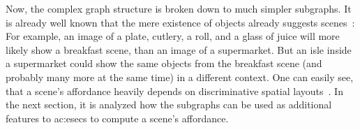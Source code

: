 Now, the complex graph structure is broken down to much simpler subgraphs.
It is already well known that the mere existence of objects already suggests scenes~\cite{zhu2014reasoning}: For example, an image of a plate, cutlery, a roll, and a glass of juice will more likely show a breakfast scene, than an image of a supermarket.
But an isle inside a supermarket could show the same objects from the breakfast scene (and probably many more at the same time) in a different context.
One can easily see, that a scene's affordance heavily depends on discriminative spatial layouts~\cite{tran2017recognition, lin2014learning}.
In the next section, it is analyzed how the subgraphs can be used as additional features to \glspl{ac:esec} to compute a scene's affordance.
